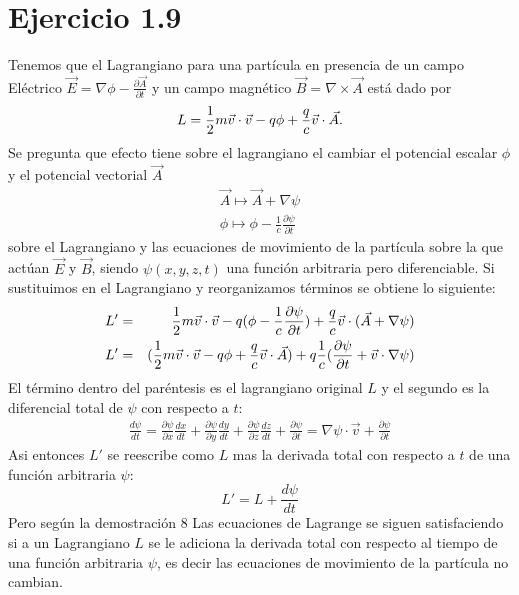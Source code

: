 \documentclass[letterpaper,12pt]{article}
\begin{document}
\section*{Ejercicio 1.9 }
Tenemos que el Lagrangiano para una part\'icula en presencia de un campo El\'ectrico 
$\vec E=\nabla \phi -\frac{\partial \vec A}{\partial t}$
y un campo magn\'etico  $\vec B=\nabla \times \vec A$ est\'a dado por 
\begin{equation}
L = {1 \over 2} m \vec{v} \cdot \vec{v}  - q\phi + {q \over c} \vec{v} \cdot \vec{A} .
\end{equation}
Se pregunta que efecto tiene sobre el lagrangiano el cambiar el potencial escalar $\phi$ y el potencial vectorial $\vec A$ 
\begin{eqnarray}
\vec A \longmapsto \vec A+\nabla \psi \\
\phi \longmapsto \phi-\frac{1}{c}\frac{\partial \psi}{\partial t}
\end{eqnarray}
sobre el Lagrangiano y las ecuaciones de movimiento de la part\'icula sobre la que act\'uan $\vec E$ y $\vec B$, siendo $\psi(x,y,z,t)$ una funci\'on arbitraria pero diferenciable.
Si sustituimos en el Lagrangiano y reorganizamos t\'erminos se obtiene lo siguiente:
\begin{eqnarray}
 L' &=&{1 \over 2} m \vec{v} \cdot \vec{v} -q (\phi-\frac{1}{c}\frac{\partial \psi}{\partial t})+\frac{q}{c}\vec v \cdot  (\vec A+\nabla \psi)\\
 L'&=&({1 \over 2} m \vec{v} \cdot \vec{v}-q \phi+\frac{q}{c}\vec v \cdot  \vec A)+q\frac{1}{c}(\frac{\partial \psi}{\partial t}+\vec v \cdot \nabla \psi)
\end{eqnarray}
El t\'ermino dentro del par\'entesis es el lagrangiano original $L$ y el segundo es la diferencial total  de $\psi$ con respecto a $t$:
\begin{eqnarray}
\frac{d \psi}{dt}=\frac{\partial \psi}{\partial x}\frac{dx}{dt}+\frac{\partial \psi}{\partial y}\frac{dy}{dt}+\frac{\partial \psi}{\partial z}\frac{dz}{dt}+\frac{\partial \psi}{\partial t}=\nabla \psi \cdot \vec v+\frac{\partial \psi}{\partial t}
\end{eqnarray}
Asi entonces $L'$ se reescribe como $L$ mas la derivada total con respecto a $t$ de una funci\'on arbitraria $\psi$:
\begin{equation}
L'=L+\frac{d \psi}{dt}
\end{equation}
Pero seg\'un la demostraci\'on 8 Las ecuaciones de Lagrange se siguen satisfaciendo si a un Lagrangiano $L$ se le adiciona la derivada total con respecto al tiempo de una funci\'on arbitraria $\psi$, es decir las ecuaciones de movimiento de la part\'icula no cambian.
\end{document}
